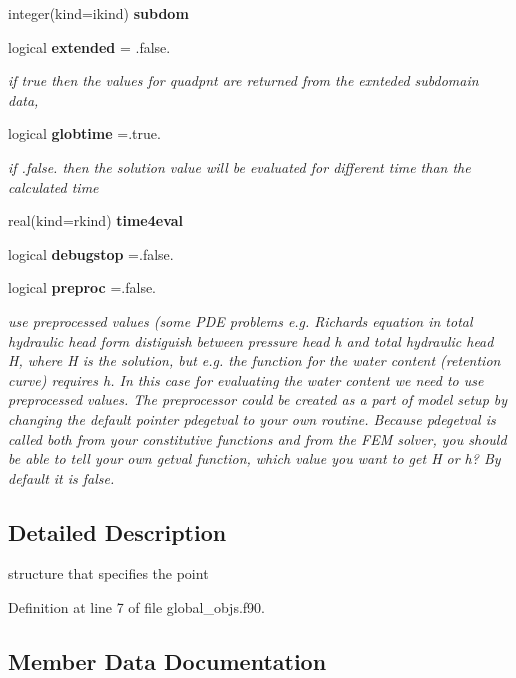 \begin{DoxyCompactItemize}
integer(kind=ikind) {\bf subdom}
\item 
logical {\bf extended} = .false.
\begin{DoxyCompactList}\small\item\em if true then the values for quadpnt are returned from the exnteded subdomain data, \end{DoxyCompactList}\item 
logical {\bf globtime} =.true.
\begin{DoxyCompactList}\small\item\em if .false. then the solution value will be evaluated for different time than the calculated time \end{DoxyCompactList}\item 
real(kind=rkind) {\bf time4eval}
\item 
logical {\bf debugstop} =.false.
\item 
logical {\bf preproc} =.false.
\begin{DoxyCompactList}\small\item\em use preprocessed values (some P\+DE problems e.\+g. Richards equation in total hydraulic head form distiguish between pressure head h and total hydraulic head H, where H is the solution, but e.\+g. the function for the water content (retention curve) requires h. In this case for evaluating the water content we need to use preprocessed values. The preprocessor could be created as a part of model setup by changing the default pointer pdegetval to your own routine. Because pdegetval is called both from your constitutive functions and from the F\+EM solver, you should be able to tell your own getval function, which value you want to get H or h? By default it is false. \end{DoxyCompactList}\end{DoxyCompactItemize}


\subsection{Detailed Description}
structure that specifies the point 

Definition at line 7 of file global\+\_\+objs.\+f90.



\subsection{Member Data Documentation}

